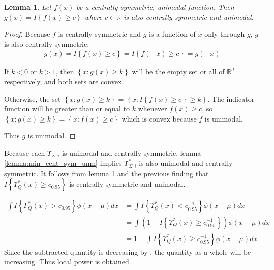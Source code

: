 \documentclass{article}
\newtheorem{lemma}[theorem]{Lemma}
\newcommand{\gi}{\Upsilon}
\begin{document}
\begin{lemma}
	\label{lemma:indct_cent_sym_unm}
	Let $f(x)$ be a centrally symmetric, unimodal function.  Then $g(x) = I\left\{f(x) \geq c\right\}$ where $c \in \mathbb{R}$ is also centrally symmetric and unimodal. 
\end{lemma}
\begin{proof}
Because $f$ is centrally symmetric and $g$ is a function of $x$ only through $g$, $g$ is also centrally symmetric:
	\begin{align*}
	g(x) = I\left\{f(x) \geq c\right\} = I\left\{f(-x) \geq c\right\} = g(-x)
	\end{align*}

	If $k < 0$ or $k > 1$, then $\left\{x : g(x) \geq k\right\}$ will be the empty set or all of $\mathbb{R}^d$ respectively, and both sets are convex.  
	
	Otherwise, the set $\left\{x : g(x) \geq k\right\} = \left\{x : I\left\{f(x) \geq c\right\} \geq k\right\}$. The indicator function will be greater than or equal to $k$ whenever $f(x) \geq c$, so $\left\{x : g(x) \geq k\right\} =\left\{x : f(x) \geq c\right\}$
	which is convex because $f$ is unimodal.

	Thus $g$ is unimodal.
\end{proof}

Because each $\gi_{\Sigma, i}$ is unimodal and centrally symmetric, lemma \ref{lemma:min_cent_sym_unm} implies $\gi^*_{\Sigma, i}$ is also unimodal and centrally symmetric. It follows from lemma \ref{lemma:indct_cent_sym_unm} and the previous finding that $I\left\{\gi^*_Q(x) \geq c_{0.95}\right\}$ is centrally symmetric and unimodal.  

\begin{align*}
	\int I\left\{\Gamma^*_Q(x) > c_{0.95}\right\} \phi(x - \mu) dx &= \int I\left\{\gi^*_Q(x) < c_{0.95}^{-1}\right\} \phi(x - \mu) dx\\
	& = \int \left(1 - I\left\{\gi^*_Q(x) \geq c^{-1}_{0.95}\right\}\right)\phi(x - \mu) dx
	\\
	&= 1 - \int I\left\{\gi^*_Q(x) \geq c^{-1}_{0.95}\right\} \phi(x - \mu) dx
\end{align*}
Since the subtracted quantity is decreasing by \citep{anderson_integral_1955}, the quantity as a whole will be increasing.  Thus local power is obtained.
\end{document}
